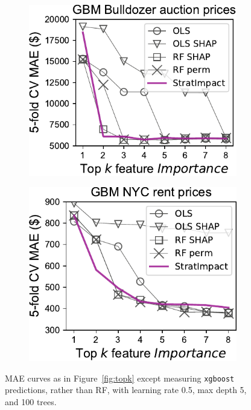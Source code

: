 \documentclass[11pt]{article}
\newcommand{\figref}[1]{Figure~\ref{#1}}
\begin{document}
\begin{figure}
\begin{subfigure}{.245\textwidth}
\includegraphics[scale=0.45]{images/bulldozer-topk-GBM-Importance.pdf}
\subcaption{}
\end{subfigure}%
\hfill
\begin{subfigure}{.245\textwidth}
    \centering
\includegraphics[scale=0.45]{images/rent-topk-GBM-Importance.pdf}
\end{subfigure}
\caption[short]{\small MAE curves as in \figref{fig:topk} except measuring {\tt xgboost} predictions, rather than RF, with learning rate 0.5,  max depth 5, and 100 trees.}
\label{fig:topk-gbm}
\end{figure}
\end{document}
